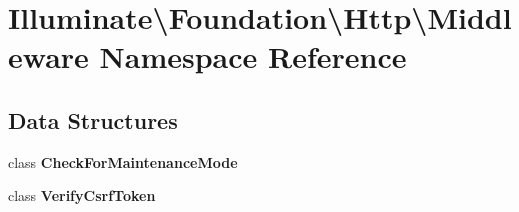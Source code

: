 \section{Illuminate\textbackslash{}Foundation\textbackslash{}Http\textbackslash{}Middleware Namespace Reference}
\label{namespace_illuminate_1_1_foundation_1_1_http_1_1_middleware}
\subsection*{Data Structures}
\begin{DoxyCompactItemize}
\item 
class {\bf Check\+For\+Maintenance\+Mode}
\item 
class {\bf Verify\+Csrf\+Token}
\end{DoxyCompactItemize}
